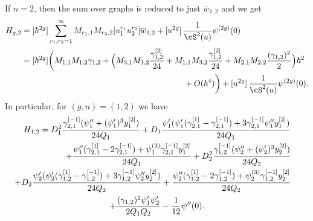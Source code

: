 If $n=2$, then the sum over graphs is reduced to just $\overline w_{1,2}$ and we get
\begin{align*}
H_{g,2}&= [\hbar^{2g}] \sum_{r_1,r_2=1}^\infty M_{r_1,1} M_{r_2,2}[u_1^{r_1}u_2^{r_2}]\overline w_{1,2}
+ [u^{2g}]\,\frac1{\cS^2(u)}\psi^{(2g)}(0)\\
&=
[\hbar^{2g}] \biggl(M_{1,1}M_{1,2}\gamma_{1,2}
+ \Bigl(M_{3,1}M_{1,2}\frac{\gamma_{1,2}^{[2]}}{24}
+M_{1,1}M_{3,2}\frac{\gamma_{1,2}^{[2]}}{24}+M_{2,1}M_{2,2}\frac{(\gamma_{1,2})^2}{2} \Bigr)\hbar^2
\\
&\hspace*{7cm}+O(\hbar^4)\biggr)
+ [u^{2g}]\,\frac1{\cS^2(u)}\psi^{(2g)}(0).
\end{align*}
In particular, for $(g,n)=(1,2)$ we have
\begin{multline*}
H_{1,2}=
D_1^2\frac{\gamma_{2,1}^{[-1]} (\psi_1''+(\psi_1')^3 y_1^{[2]})}{24Q_1}+
D_1\frac{\psi_1' (\psi_1' (\gamma_{2,1}^{[1]}-\gamma_{2,1}^{[-1]})+3 \gamma_{2,1}^{[-1]} \psi_1'' y_1^{[2]})}
{24Q_1}\\
\shoveright{+\frac{\psi_1''(\gamma_{2,1}^{[1]}-2 \gamma_{2,1}^{[-1]})+\psi_1^{(3)} \gamma_{2,1}^{[-1]} y_1^{[2]}}{24Q_1}
+D_2^2\frac{\gamma_{1,2}^{[-1]} (\psi_2''+(\psi_2')^3 y_2^{[2]})}{24Q_2}}\\
\shoveright{+D_2\frac{\psi_2' (\psi_2' (\gamma_{1,2}^{[1]}-\gamma_{1,2}^{[-1]})+3 \gamma_{1,2}^{[-1]} \psi_2'' y_2^{[2]})}
{24Q_2}+
\frac{\psi_2''(\gamma_{1,2}^{[1]}-2 \gamma_{1,2}^{[-1]})+\psi_2^{(3)} \gamma_{1,2}^{[-1]} y_2^{[2]}}{24Q_2}}
\\
+\frac{(\gamma_{1,2})^2 \psi_1' \psi_2'}{2Q_1Q_2}
-\frac{1}{12}\psi''(0).
\end{multline*}

